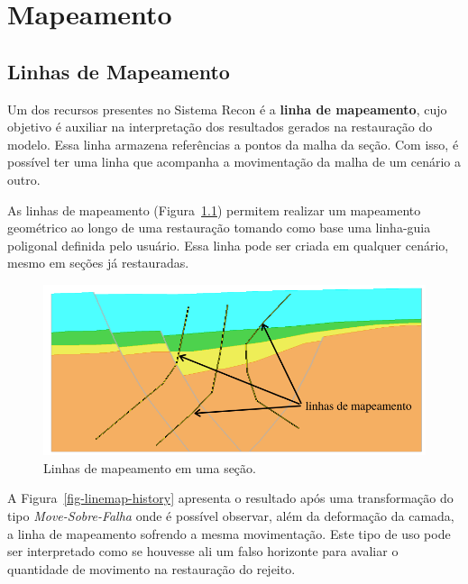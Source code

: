 
\chapter{Mapeamento}

\section{Linhas de Mapeamento}

Um dos recursos presentes no Sistema Recon é a \textbf{linha de mapeamento}, cujo objetivo é auxiliar na interpretação dos resultados gerados na restauração do modelo. Essa linha armazena referências a pontos da malha da seção. Com isso, é possível ter uma linha que acompanha a movimentação da malha de um cenário a outro.

As linhas de mapeamento (Figura~\ref{fig-linemap}) permitem realizar um mapeamento geométrico ao longo de uma restauração tomando como base uma linha-guia poligonal definida pelo usuário. Essa linha pode ser criada em qualquer cenário, mesmo em seções já restauradas.

\begin{figure} [h]
  \begin{center}
    \includegraphics[width=400pt]{images/fig-linhas-de-mapeamento-ed}
    \caption{Linhas de mapeamento em uma seção.}\label{fig-linemap}
  \end{center}
\end{figure}

A Figura~\ref{fig-linemap-history} apresenta o resultado após uma transformação do tipo \textit{Move-Sobre-Falha} onde é possível observar, além da deformação da camada, a linha de mapeamento sofrendo a mesma movimentação. Este tipo de uso pode ser interpretado como se houvesse ali um falso horizonte para avaliar o quantidade de movimento na restauração do rejeito.

